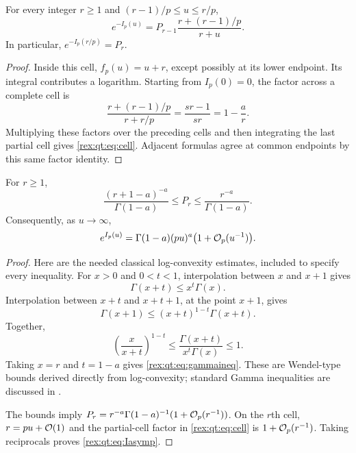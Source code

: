 \begin{proposition}\label{rex:qt:prop:cell}
For every integer $r\ge1$ and $(r-1)/p\le u\le r/p$,
\begin{equation}\label{rex:qt:eq:cell}
 e^{-I_p(u)}=P_{r-1}\frac{r+(r-1)/p}{r+u}.
\end{equation}
In particular, $e^{-I_p(r/p)}=P_r$.
\end{proposition}
\begin{proof}
Inside this cell, $f_p(u)=u+r$, except possibly at its lower endpoint. Its integral contributes a logarithm. Starting from $I_p(0)=0$, the factor across a complete cell is
\[
 \frac{r+(r-1)/p}{r+r/p}
 =\frac{sr-1}{sr}=1-\frac a r.
\]
Multiplying these factors over the preceding cells and then integrating the last partial cell gives \eqref{rex:qt:eq:cell}. Adjacent formulas agree at common endpoints by this same factor identity.
\end{proof}

\begin{lemma}\label{rex:qt:lem:gamma}
For $r\ge1$,
\begin{equation}\label{rex:qt:eq:gammaineq}
 \frac{(r+1-a)^{-a}}{\Gamma(1-a)}
 \le P_r\le\frac{r^{-a}}{\Gamma(1-a)}.
\end{equation}
Consequently, as $u\to\infty$,
\begin{equation}\label{rex:qt:eq:Iasymp}
 e^{I_p(u)}=\Gamma(1-a)(pu)^a\bigl(1+\mathcal O_p(u^{-1})\bigr).
\end{equation}
\end{lemma}
\begin{proof}
Here are the needed classical log-convexity estimates, included to specify every inequality. For $x>0$ and $0<t<1$, interpolation between $x$ and $x+1$ gives
\[
 \Gamma(x+t)\le x^t\Gamma(x).
\]
Interpolation between $x+t$ and $x+t+1$, at the point $x+1$, gives
\[
 \Gamma(x+1)\le(x+t)^{1-t}\Gamma(x+t).
\]
Together,
\[
 \left(\frac{x}{x+t}\right)^{1-t}
 \le\frac{\Gamma(x+t)}{x^t\Gamma(x)}\le1.
\]
Taking $x=r$ and $t=1-a$ gives \eqref{rex:qt:eq:gammaineq}. These are Wendel-type bounds derived directly from log-convexity; standard Gamma inequalities are discussed in \cite[\S5.6]{dlmf}.

The bounds imply $P_r=r^{-a}\Gamma(1-a)^{-1}(1+\mathcal O_p(r^{-1}))$. On the $r$th cell, $r=pu+\mathcal O(1)$ and the partial-cell factor in \eqref{rex:qt:eq:cell} is $1+\mathcal O_p(r^{-1})$. Taking reciprocals proves \eqref{rex:qt:eq:Iasymp}.
\end{proof}

